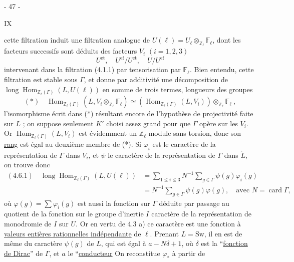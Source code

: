 \begin{center}- 47 -\end{center}\hfill IX

cette filtration induit une filtration analogue de $U(\ell)=U_\ell\otimes_{\mathbb Z_\ell}\mathbb F_\ell$, dont les facteurs successifs sont déduits des facteurs $V_i$ $(i=1,2,3)$
\[
 U^{\mathrm{et}},\quad U^{\mathrm{ef}}/U^{\mathrm{et}},\quad U/U^{\mathrm{ef}}
\]
intervenant dans la filtration (4.1.1) par tensorisation par $\mathbb F_\ell$. Bien entendu, cette filtration est stable sous $\Gamma$, et donne par additivité une décomposition de $\operatorname{long}\operatorname{Hom}_{\mathbb Z_\ell(\Gamma)}(L,U(\ell))$ en somme de trois termes, longueurs des groupes
\[
 (*)\quad\operatorname{Hom}_{\mathbb Z_\ell(\Gamma)}(L,V_i\otimes_{\mathbb Z_\ell}\mathbb F_\ell)
 \simeq(\operatorname{Hom}_{\mathbb Z_\ell(\Gamma)}(L,V_i))\otimes_{\mathbb Z_\ell}\mathbb F_\ell\ ,
\]
l'isomorphisme écrit dans (*) résultant encore de l'hypothèse de projectivité faite sur $L$ ; on suppose seulement $K'$ choisi assez grand pour que $\Gamma$ opère sur les $V_i$. Or $\operatorname{Hom}_{\mathbb Z_\ell(\Gamma)}(L,V_i)$ est évidemment un $\mathbb Z_\ell$-module sans torsion, donc son \uline{rang} est égal au deuxième membre de (*). Si $\varphi_i$ est le caractère de la représentation de $\Gamma$ dans $V_i$, et $\psi$ le caractère de la représentation de $\Gamma$ dans $\check L$, on trouve donc
\[
 \begin{aligned}
 (4.6.1)\quad\operatorname{long}\operatorname{Hom}_{\mathbb Z_\ell(\Gamma)}(L,U(\ell))
 &=\sum_{1\leq i\leq3}N^{-1}\sum_{g\in\Gamma}\psi(g)\varphi_i(g)\\
 &=N^{-1}\sum_{g\in\Gamma}\psi(g)\varphi(g),\quad\text{avec }N=\operatorname{card}\Gamma,
 \end{aligned}
\]
où $\varphi(g)=\sum\varphi_i(g)$ est aussi la fonction sur $\Gamma$ déduite par passage au quotient de la fonction sur le groupe d'inertie $I$ caractère de la représentation de monodromie de $I$ sur $U$. Or en vertu de 4.3 a) ce caractère est une fonction à \uline{valeurs entières rationnelles indépendante} de $\ell$.
Prenant $L=\mathrm{Sw}$, il en est de même du caractère $\psi(g)$ de $L$, qui est égal à $a-N\delta+1$, où $\delta$ est la ``\uline{fonction de Dirac}'' de $\Gamma$, et $a$ le ``\uline{conducteur}
On reconstitue $\varphi_*$ à partir de

